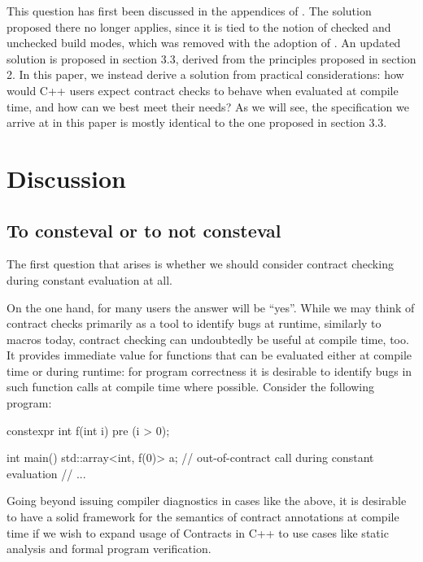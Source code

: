 This question has first been discussed in the appendices of \cite{P2834R1}. The solution proposed there no longer applies, since it is tied to the notion of checked and unchecked build modes, which was removed with the adoption of \cite{P2877R0}. An updated solution is proposed in \cite{P2932R2} section 3.3, derived from the  principles proposed in \cite{P2932R2} section 2. In this paper, we instead derive a solution from practical considerations: how would C++ users expect contract checks to behave when evaluated at compile time, and how can we best meet their needs? As we will see, the specification we arrive at in this paper is mostly identical to the one proposed in \cite{P2932R2} section 3.3.


\section{Discussion}

\subsection{To consteval or to not consteval}

The first question that arises is whether we should consider contract checking during constant evaluation at all.

\pagebreak %

On the one hand, for many users the answer will be ``yes''. While we may think of contract checks primarily as a tool to identify bugs at runtime, similarly to  macros today, contract checking can undoubtedly be useful at compile time, too. It provides immediate value for  functions that can be evaluated either at compile time or during runtime: for program correctness it is desirable to identify bugs in such function calls at compile time where possible. Consider the following program:

\begin{codeblock}
constexpr int f(int i)  
  pre (i > 0);

int main() {
  std::array<int, f(0)> a;  // out-of-contract call during constant evaluation
  // ...
}
\end{codeblock}

Going beyond issuing compiler diagnostics in cases like the above, it is desirable to have a solid framework for the semantics of contract annotations at compile time if we wish to expand usage of Contracts in C++ to use cases like static analysis and formal program verification. 


